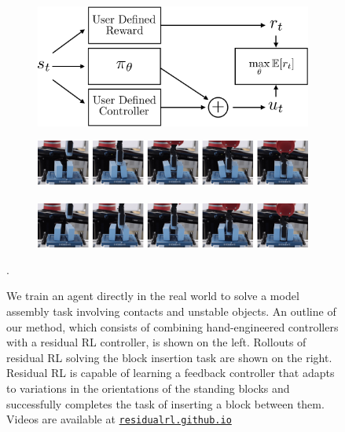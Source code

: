 \begin{figure}[t]
    \vspace{6pt}
    \centering
    \begin{subfigure}[b]{0.45\linewidth}
        \includegraphics[width=0.9\linewidth]{residualrl/figs/residual_fig1_v4-crop.pdf}
    \end{subfigure}
    \begin{subfigure}[b]{0.54\linewidth}
        \includegraphics[width=0.99\linewidth]{residualrl/figs/rollout1.png} \\ \\
        \includegraphics[width=0.99\linewidth]{residualrl/figs/rollout2.png}
    \end{subfigure}
    \caption{We train an agent directly in the real world to solve a model assembly task involving contacts and unstable objects. An outline of our method, which consists of combining hand-engineered controllers with a residual RL controller, is shown on the left. Rollouts of residual RL solving the block insertion task are shown on the right. Residual RL is capable of learning a feedback controller that adapts to variations in the orientations of the standing blocks and successfully completes the task of inserting a block between them. Videos are available at \href{http://residualrl.github.io}{\texttt{residualrl.github.io}}}.
    \label{fig:fig1}
\end{figure}

